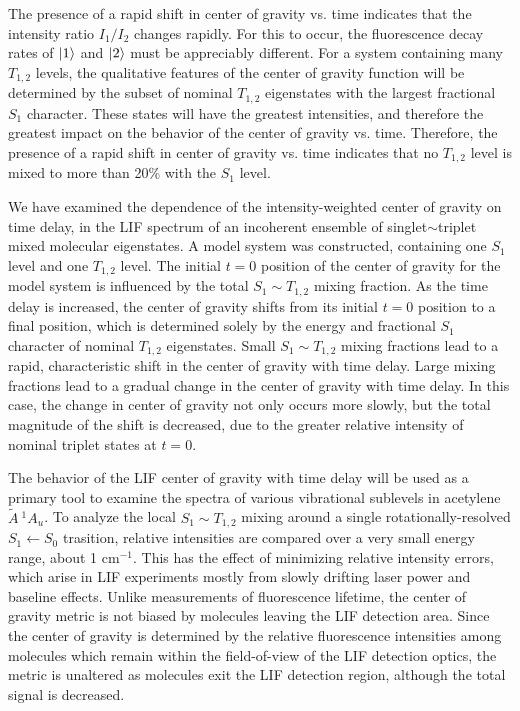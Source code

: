 \documentclass[12pt]{mitthesis}
\newcommand{\rcm}{cm$^{-1}$}
\newcommand{\astate}{$
  \tilde{A} \: ^1\!A_u
  $}
\begin{document}
The presence of a rapid shift in center of gravity vs. time indicates
that the intensity ratio $I_1/I_2$ changes rapidly.  For this to
occur, the fluorescence decay rates of $\mathinner{|{1}\rangle}$ and $\mathinner{|{2}\rangle}$ must be
appreciably different.  For a system containing many $T_{1,2}$ levels,
the qualitative features of the center of gravity function will be
determined by the subset of nominal $T_{1,2}$ eigenstates with the
largest fractional $S_1$ character.  These states will have the
greatest intensities, and therefore the greatest impact on the
behavior of the center of gravity vs. time.  Therefore, the presence
of a rapid shift in center of gravity vs. time indicates that no
$T_{1,2}$ level is mixed to more than 20\% with the $S_1$ level.

We have examined the dependence of the intensity-weighted center of
gravity on time delay, in the LIF spectrum of an incoherent ensemble
of singlet$\sim$triplet mixed molecular eigenstates.  A model system
was constructed, containing one $S_1$ level and one $T_{1,2}$ level.
The initial $t=0$ position of the center of gravity for the model
system is influenced by the total $S_1 \sim T_{1,2}$ mixing fraction.
As the time delay is increased, the center of gravity shifts from its
initial $t=0$ position to a final position, which is determined solely
by the energy and fractional $S_1$ character of nominal $T_{1,2}$
eigenstates.  Small $S_1 \sim T_{1,2}$ mixing fractions lead to a
rapid, characteristic shift in the center of gravity with time delay.
Large mixing fractions lead to a gradual change in the center of
gravity with time delay.  In this case, the change in center of
gravity not only occurs more slowly, but the total magnitude of the
shift is decreased, due to the greater relative intensity of nominal
triplet states at $t=0$.

The behavior of the LIF center of gravity with time delay will be used
as a primary tool to examine the spectra of various vibrational
sublevels in acetylene \astate.  To analyze the local $S_1 \sim
T_{1,2}$ mixing around a single rotationally-resolved $S_1 \leftarrow
S_0$ trasition, relative intensities are compared over a very small
energy range, about 1 \rcm.  This has the effect of minimizing
relative intensity errors, which arise in LIF experiments mostly from
slowly drifting laser power and baseline effects.  Unlike measurements
of fluorescence lifetime, the center of gravity metric is not biased
by molecules leaving the LIF detection area.  Since the center of
gravity is determined by the relative fluorescence intensities among
molecules which remain within the field-of-view of the LIF detection
optics, the metric is unaltered as molecules exit the LIF detection
region, although the total signal is decreased.
\end{document}
